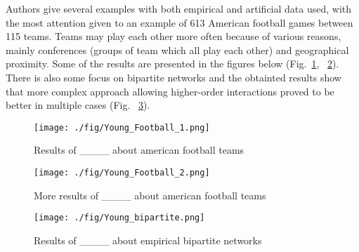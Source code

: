 \begin{itemize}
    Authors give several examples with both empirical and artificial data used, with the most attention given to an example of 613 American football games between 115 teams. Teams may play each other more often because of various reasons, mainly conferences (groups of team which all play each other) and geographical proximity. Some of the results are presented in the figures below (Fig.~\ref{Young_football_1}, ~\ref{Young_football_2}). There is also some focus on bipartite networks and the obtainted results show that more complex approach allowing higher-order interactions proved to be better in multiple cases (Fig. ~\ref{Young_bipartite}).

    \begin{figure}[h!]
	\begin{center}
        \texttt{[image: ./fig/Young\_Football\_1.png]}
        \caption{Results of ____ about american football teams} 
    	\label{Young_football_1}
    \end{center}
    \end{figure}

    \begin{figure}[h!]
	\begin{center}
        \texttt{[image: ./fig/Young\_Football\_2.png]}
        \caption{More results of ____ about american football teams} 
    	\label{Young_football_2}
    \end{center}
    \end{figure}

    \begin{figure}[h!]
	\begin{center}
        \texttt{[image: ./fig/Young\_bipartite.png]}
        \caption{Results of ____ about empirical bipartite networks} 
    	\label{Young_bipartite}
    \end{center}
    \end{figure}


\end{itemize}
